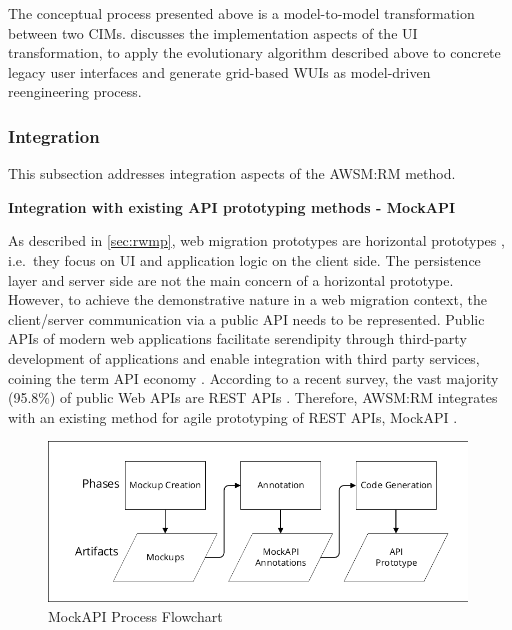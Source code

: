 The conceptual process presented above is a model-to-model transformation between two CIMs.
 discusses the implementation aspects of the UI transformation, to apply the evolutionary algorithm described above to concrete legacy user interfaces and generate grid-based WUIs as model-driven reengineering process.

\hypertarget{sec:rm.integration}{%
\subsubsection{Integration}\label{sec:rm.integration}}

This subsection addresses integration aspects of the AWSM:RM method.

\textbf{Integration with existing API prototyping methods - MockAPI}

As described in \cref{sec:rwmp}, web migration prototypes are horizontal prototypes \autocite{Wallmueller2001SoftwareQuality}, i.e.~they focus on UI and application logic on the client side.
The persistence layer and server side are not the main concern of a horizontal prototype.
However, to achieve the demonstrative \autocite{ISO/IEEE24765Vocabulary} nature in a web migration context, the client/server communication via a public API needs to be represented.
Public APIs of modern web applications facilitate serendipity through third-party development of applications and enable integration with third party services, coining the term API economy \autocite{Tan2016APIEconomy}.
According to a recent survey, the vast majority (95.8\%) of public Web APIs are REST APIs \autocite{Neumann2018PublicApis}.
Therefore, AWSM:RM integrates with an existing method for agile prototyping of REST APIs, MockAPI \autocite{Rivero2013,Rivero2014Electra}.

\begin{figure}
\hypertarget{fig:awsm.rm.mockapi.process}{%
\centering
\includegraphics[width=0.99\textwidth]{../figures/mockapi-flowchart.pdf}
\caption{MockAPI Process Flowchart}\label{fig:awsm.rm.mockapi.process}
}
\end{figure}

